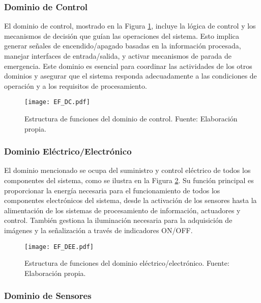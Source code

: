 \subsubsection{Dominio de Control}

El dominio de control, mostrado en la Figura \ref{fig:EF_DC}, incluye la lógica de control y los mecanismos de decisión que guían las operaciones del sistema. Esto implica generar señales de encendido/apagado basadas en la información procesada, manejar interfaces de entrada/salida, y activar mecanismos de parada de emergencia. Este dominio es esencial para coordinar las actividades de los otros dominios y asegurar que el sistema responda adecuadamente a las condiciones de operación y a los requisitos de procesamiento.

\begin{figure}[H]
	\centering
	\texttt{[image: EF\_DC.pdf]}
	\caption[Estructura de funciones del dominio de control.]{Estructura de funciones del dominio de control. Fuente: Elaboración propia.}
	\label{fig:EF_DC}
\end{figure}

\subsubsection{Dominio Eléctrico/Electrónico}

El dominio mencionado se ocupa del suministro y control eléctrico de todos los componentes del sistema, como se ilustra en la Figura \ref{fig:EF_DEE}. Su función principal es proporcionar la energía necesaria para el funcionamiento de todos los componentes electrónicos del sistema, desde la activación de los sensores hasta la alimentación de los sistemas de procesamiento de información, actuadores y control. También gestiona la iluminación necesaria para la adquisición de imágenes y la señalización a través de indicadores ON/OFF.

\begin{figure}[H]
	\centering
	\texttt{[image: EF\_DEE.pdf]}
	\caption[Estructura de funciones del dominio eléctrico/electrónico.]{Estructura de funciones del dominio eléctrico/electrónico. Fuente: Elaboración propia.}
	\label{fig:EF_DEE}
\end{figure}

\subsubsection{Dominio de Sensores}

